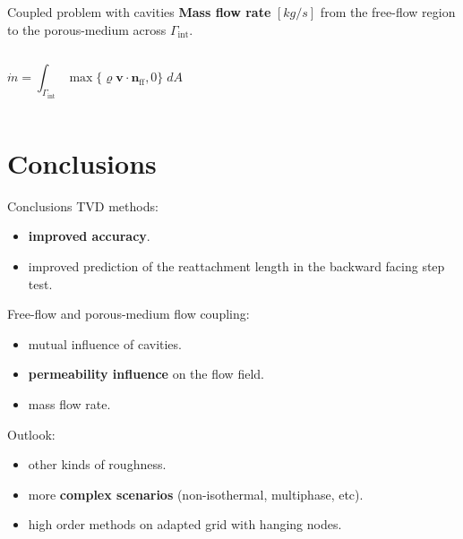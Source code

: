 \documentclass{beamer}
\begin{document}
%	
\begin{frame}{Coupled problem with cavities}
\textbf{Mass flow rate} $[\si{kg/s}]$ from the free-flow region to the porous-medium across $\Gamma_\text{int}$.
\begin{columns}
	\begin{equation*}
	\dot{m} = \int_{\Gamma_\text{int}} \max \{ \varrho \mathbf{v} \cdot 
	\mathbf{n}_\text{ff} , 0 \} \; dA
	\end{equation*}
	\begin{figure}
		\centering
		
	\end{figure}
\end{columns}
\end{frame}
\section{Conclusions}
\begin{frame}{Conclusions}
TVD methods:
\begin{itemize}
	\item \textbf{improved accuracy}.
	\item improved prediction of the reattachment length in the backward facing step test.
\end{itemize}
Free-flow and porous-medium flow coupling:
\begin{itemize}
	\item mutual influence of cavities.
	\item \textbf{permeability influence} on the flow field.
	\item mass flow rate.
\end{itemize}
\pause
Outlook:
\begin{itemize}
	\item other kinds of roughness.
	\item more \textbf{complex scenarios} (non-isothermal, multiphase, etc).
	\item high order methods on adapted grid with hanging nodes.
\end{itemize}
\end{frame}
\end{document}
